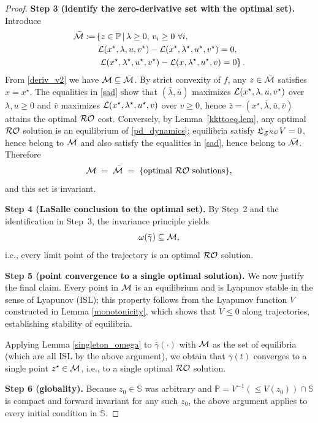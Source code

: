 \documentclass[journal,twoside,web]{ieeecolor}
\newcommand{\rev}[1]{\textcolor{revisionblue}{#1}}
\begin{document}
\begin{proof}
\medskip
\rev{\textbf{Step 3 (identify the zero-derivative set with the optimal set).}
Introduce
\begin{align}
\bar{\cal M}:=& \left\{z \in \mathbb P\,\middle|\,\lambda\geq 0,\, v_i\geq 0\ \forall i,\right.\nonumber\\
&\ {\cal L}(x^\star,\lambda,u,v^\star)-{\cal L}(x^\star,\lambda^\star,u^\star,v^\star)=0,\nonumber\\
&\left.\ {\cal L}(x^\star,\lambda^\star,u^\star,v^\star)-{\cal L}(x,\lambda^\star,u^\star,v)=0 \right\}.
\label{sad}
\end{align}
From \eqref{deriv_v2} we have ${\cal M}\subseteq \bar{\cal M}$.
By strict convexity of $f$, any $z\in\bar{\cal M}$ satisfies $x=x^\star$. The equalities in \eqref{sad} show that $(\bar\lambda,\bar u)$ maximizes ${\cal L}(x^\star,\lambda,u,v^\star)$ over $\lambda,u\ge 0$ and $\bar v$ maximizes ${\cal L}(x^\star,\lambda^\star,u^\star,v)$ over $v\ge 0$, hence $\bar z=(x^\star,\bar\lambda,\bar u,\bar v)$ attains the optimal ${\cal RO}$ cost.
Conversely, by Lemma~\ref{kkttoeq.lem}, any optimal ${\cal RO}$ solution is an equilibrium of \eqref{pd_dynamics}; equilibria satisfy $\mathfrak{L}_{{\cal Z}^{\cal RO}}V=0$, hence belong to ${\cal M}$ and also satisfy the equalities in \eqref{sad}, hence belong to $\bar{\cal M}$. Therefore
\[
{\cal M}\;=\;\bar{\cal M}\;=\;\{\text{optimal ${\cal RO}$ solutions}\},
\]
and this set is invariant.}

\medskip
\rev{\textbf{Step 4 (LaSalle conclusion to the optimal set).}
By Step~2 and the identification in Step~3, the invariance principle yields
\[
\omega(\bar\gamma)\subseteq {\cal M},
\]
i.e., every limit point of the trajectory is an optimal ${\cal RO}$ solution.}

\medskip
\rev{\textbf{Step 5 (point convergence to a single optimal solution).}
We now justify the final claim. Every point in ${\cal M}$ is an equilibrium and is Lyapunov stable in the sense of Lyapunov (ISL); this property follows from the Lyapunov function $V$ constructed in Lemma \ref{monotonicity}, which shows that $\dot{V} \leq 0$ along trajectories, establishing stability of equilibria.

Applying Lemma \ref{singleton_omega} to $\bar\gamma(\cdot)$ with ${\cal M}$ as the set of equilibria (which are all ISL by the above argument), we obtain that $\bar\gamma(t)$ converges to a single point $z^\star\in{\cal M}$, i.e., to a single optimal ${\cal RO}$ solution.}

\medskip
\rev{\textbf{Step 6 (globality).}
Because $z_0\in\mathbb S$ was arbitrary and $\mathbb P=V^{-1}(\le V(z_0))\cap\mathbb S$ is compact and forward invariant for any such $z_0$, the above argument applies to every initial condition in $\mathbb S$.}
\end{proof}
\fi
\end{document}
